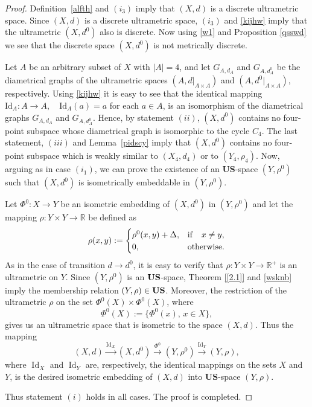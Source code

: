 \documentclass[11pt]{article}
\theoremstyle{definition}
\theoremstyle{remark}
\numberwithin{equation}{section}
\begin{document}
\begin{proof}
 Definition~\ref{alfth} and $(i_3)$ imply that $(X,d)$ is a discrete ultrametric space. Since $(X,d)$ is a discrete ultrametric space, $(i_3)$ and \eqref{kijhw}  imply that 
the ultrametric $(X,d^0)$ also is discrete.
Now using \eqref{w1} and Proposition \ref{qsswd} we see that the discrete space $(X,d^{0})$ is not metrically discrete.  

Let $A$ be an arbitrary subset of $X$ with $|A|=4$, and let $G_{A,d_A}$ and $G_{A,d^{0}_A}$ be the diametrical graphs of the ultrametric spaces $(A, d\big|_{A\times A})$ and $(A, d^{0}\big|_{A\times A}),$ respectively.  
Using \eqref{kijhw} it is easy to see that the identical mapping 
\(
\mathrm{Id}_A : A \to A, \quad \mathrm{Id}_A(a) = a
\)
for each $a \in A$, is an isomorphism of the diametrical graphs $G_{A,d_A}$ and $G_{A,d^{0}_A}$.
Hence, by statement $(ii)$, \((X,d^0)\) 
contains no four-point subspace whose diametrical graph is isomorphic to the cycle $C_4$. 
The last statement, $(iii)$ and Lemma~\ref{pidscy} imply that 
\((X,d^0)\) contains no four-point subspace which is weakly similar to $(X_4,d_4)$ or to $(Y_4,\rho_4)$.
Now, arguing as in case $(i_1)$, we can prove the existence of 
an {\bf US}-space \((Y,\rho^0)\) such that \((X,d^0)\) is isometrically embeddable in \((Y,\rho^0)\).


Let \(\Phi^0 : X \to Y\) be an isometric embedding of \((X,d^0)\) in \((Y,\rho^0)\) and let the mapping 
$
\rho : Y \times Y \to \mathbb{R} 
$
be defined as
\begin{equation}
    \label{wsknb}
\rho(x,y) := 
\begin{cases}
\rho^0(x,y)+\Delta, & {\rm if}\quad x\neq y,\\
0, & {\rm otherwise}.
\end{cases}
\end{equation}
As in the case of transition \(d \to d^0\), it is easy to verify that \(\rho : Y \times Y \to \mathbb{R}^+\) 
is an ultrametric on \(Y\). Since $(Y,\rho^0)$ is an ${\bf US}$-space, Theorem \ref{[2.1]} and \eqref{wsknb} imply the membership relation $(Y,\rho)\in {\bf US}$. Moreover, the restriction of the ultrametric \(\rho \) on the set \(\Phi^0(X)\times \Phi^0(X)\), where 
\[
\Phi^0(X) := \{\Phi^0(x), \, x \in X\},
\]
gives us an ultrametric space that is isometric to the space \((X,d)\).
Thus the mapping
\[
(X,d) \xrightarrow{\operatorname{Id}_X} (X,d^0) 
\xrightarrow{\Phi^0} (Y,\rho^0) 
\xrightarrow{\operatorname{Id}_Y} (Y,\rho),
\]
where \(\operatorname{Id}_X\) and \(\operatorname{Id}_Y\) are, respectively, the identical mappings on the sets
\(X\) and \(Y\), 
is the desired isometric embedding of \((X,d)\) into {\bf US}-space $(Y,\rho)$.

Thus statement $(i)$ holds in all cases. 
The proof is completed.


\end{proof}
\end{document}
